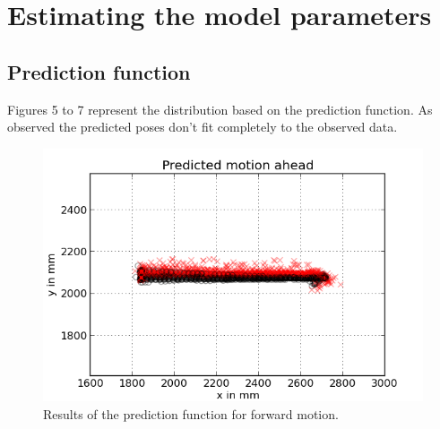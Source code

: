 \documentclass{scrartcl}
\begin{document}
\section{Estimating the model parameters }

\subsection{Prediction function}



Figures 5 to 7 represent the distribution based on the prediction function. As observed the predicted poses don't fit completely to the observed data.

\begin{figure}[H]
\centering
\begin{minipage}{.5\textwidth}
  \centering
  \includegraphics[width=1\linewidth]{img/predictahead.png}
\end{minipage}%

\caption{Results of the prediction function for forward motion. }
\label{fig:prediction}
\end{figure}
\end{document}
